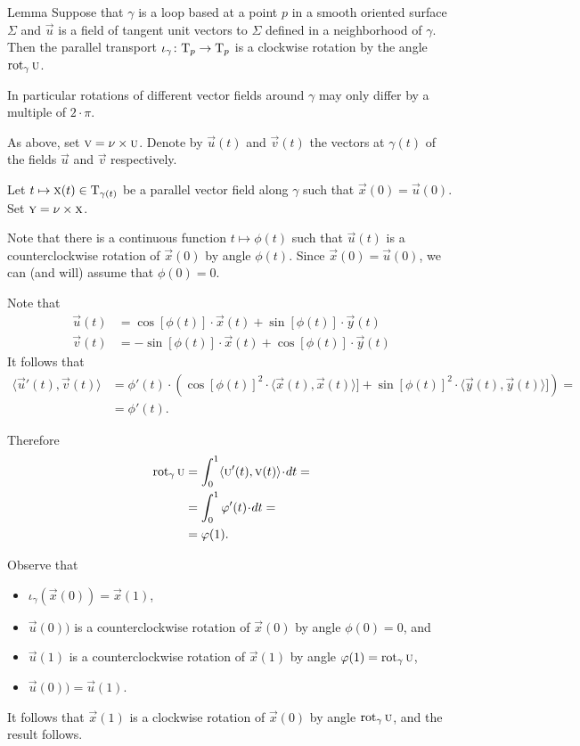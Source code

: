 \begin{thm}{Lemma}\label{lem:rotation-parallel}
Suppose that $\gamma$ is a loop based at a point $p$ in a smooth oriented surface $\Sigma$ and $\vec u$ is a field of tangent unit vectors to $\Sigma$ defined in a neighborhood of $\gamma$.
Then the parallel transport $\iota_\gamma\colon\mathrm{T}_p\to\mathrm{T}_p$ is a clockwise rotation by the angle $\mathop{\rm rot}\nolimits_\gamma\textsc u$.

In particular rotations of different vector fields around $\gamma$ may only differ by a multiple of $2\cdot\pi$.
\end{thm}

As above, set $\textsc v=\nu\times\textsc u$. 
Denote by $\vec u(t)$ and $\vec v(t)$ the vectors at $\gamma(t)$ of the fields $\vec u$ and $\vec v$ respectively.

Let $t\mapsto \textsc x(t)\in \mathrm{T}_{\gamma(t)}$ be a parallel vector field along $\gamma$ such that $\vec x(0)=\vec u(0)$.
Set $\textsc y=\nu\times\textsc x$.

Note that there is a continuous function $t\mapsto \phi(t)$ such that 
$\vec u(t)$ is a counterclockwise rotation of $\vec x(0)$ by angle $\phi(t)$.
Since $\vec x(0)=\vec u(0)$, we can (and will) assume that $\phi(0)=0$.

Note that
\begin{align*}
\vec u(t)&=\cos[\phi(t)]\cdot \vec x(t)+\sin[\phi(t)]\cdot \vec y(t)
\\
\vec v(t)&=-\sin[\phi(t)]\cdot \vec x(t)+\cos[\phi(t)]\cdot \vec y(t)
\end{align*}
It follows that 
\begin{align*}
\langle\vec u'(t),\vec v(t)\rangle
&=\phi'(t)\cdot(\cos[\phi(t)]^2\cdot \langle\vec x(t),\vec x(t)\rangle]+\sin[\phi(t)]^2\cdot \langle\vec y(t),\vec y(t)\rangle])=
\\
&=\phi'(t).
\end{align*}

Therefore
\begin{align*}
\rot_\gamma\vec u&=\int_0^1\langle\vec u'(t),\vec v(t)\rangle\cdot dt=
\\
&=\int_0^1\phi'(t)\cdot dt=
\\
&=\phi(1).
\end{align*}

Observe that 
\begin{itemize}
\item $\iota_\gamma(\vec x(0))=\vec x(1)$,

\item $\vec u(0))$ is a counterclockwise rotation of $\vec x(0)$ by angle $\phi(0)=0$, and 

\item $\vec u(1)$ is a counterclockwise rotation of $\vec x(1)$ by angle $\varphi(1)=\mathop{\rm rot}\nolimits_\gamma\textsc u$,

\item $\vec u(0))=\vec u(1)$.
\end{itemize}
It follows that $\vec x(1)$ is a clockwise rotation of $\vec x(0)$ by angle $\mathop{\rm rot}\nolimits_\gamma\textsc u$, and the result follows.
\qeds


